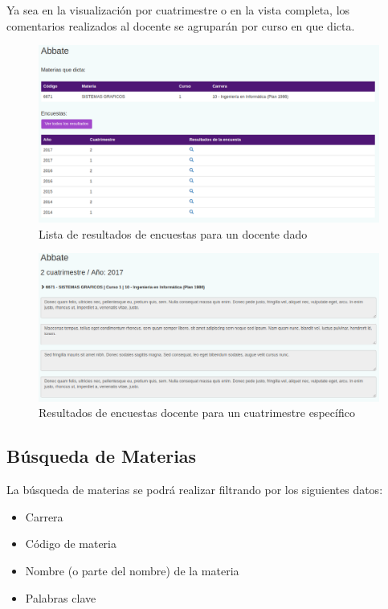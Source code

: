 \documentclass[a4paper]{article}
\begin{document}
Ya sea en la visualización por cuatrimestre o en la vista completa, los comentarios realizados al docente se agruparán por curso en que dicta.

\begin{figure}[H]
\centering
\includegraphics[scale=0.35]{Imagenes/resultados_encuesta_docente.png}\par
\caption{Lista de resultados de encuestas para un docente dado}
\end{figure}

\begin{figure}[H]
\centering
\includegraphics[scale=0.35]{Imagenes/resultados_encuesta_cuatrimestre_docente.png}\par
\caption{Resultados de encuestas docente para un cuatrimestre específico}
\end{figure}

\subsection{Búsqueda de Materias}

La búsqueda de materias se podrá realizar filtrando por los siguientes datos:

\begin{itemize}
	\item Carrera
	\item Código de materia
	\item Nombre (o parte del nombre) de la materia
	\item Palabras clave
\end{itemize}
\end{document}
